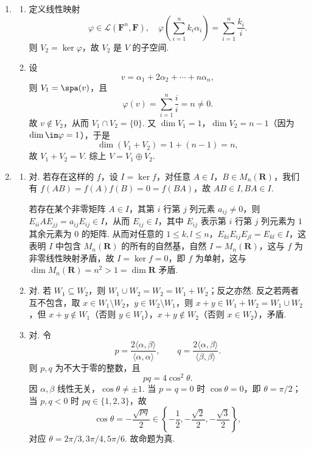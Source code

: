 \begin{enumerate}
\begin{enumerate}
        \item $k=2$：对角元为零，且 $a_{ji}=2a_{ij}\ (i<j)$. 基为
        \[
            \{E_{ij}+2E_{ji}\mid 1\leqslant i<j\leqslant n\},
        \]
        维数为 $\dfrac{n(n-1)}2$.
    \end{enumerate}

    \item
    \begin{enumerate}
        \item 定义线性映射
        \[
            \varphi\in\mathcal{L}(\mathbf{F}^n,\mathbf{F}), \quad\varphi\left(\sum_{i=1}^nk_i\alpha_i\right)
            =\sum_{i=1}^n\frac{k_i}{i}.
        \]
        则 $V_2=\ker\varphi$，故 $V_2$ 是 $V$ 的子空间.

        \item 设
        \[
            v=\alpha_1+2\alpha_2+\cdots+n\alpha_n,
        \]
        则 $V_1=\spa(v)$，且
        \[
            \varphi(v)=\sum_{i=1}^n\frac{i}{i}=n\neq 0.
        \]
        故 $v\notin V_2$，从而 $V_1\cap V_2=\{0\}$. 又 $\dim V_1=1$，$\dim V_2=n-1$（因为 $\dim\im\varphi=1$），于是
        \[
            \dim(V_1+V_2)=1+(n-1)=n,
        \]
        故 $V_1+V_2=V$. 综上 $V=V_1\oplus V_2$.
    \end{enumerate}

    \item
    \begin{enumerate}
        \item 对. 若存在这样的 $f$，设 $I=\ker f$，对任意 $A \in I$，$B \in M_n(\mathbf{R})$，我们有 $f(AB)=f(A)f(B)=0=f(BA)$，故 $AB \in I, BA \in I$.

        若存在某个非零矩阵 $A \in I$，其第 $i$ 行第 $j$ 列元素 $a_{ij}\neq 0$，则 $E_{ii}AE_{jj}=a_{ij}E_{ij}\in I$，从而 $E_{ij} \in I$，其中 $E_{ij}$ 表示第 $i$ 行第 $j$ 列元素为 $1$ 其余元素为 $0$ 的矩阵. 从而对任意的 $1 \leqslant k,l \leqslant n$，$E_{ki}E_{ij}E_{jl}=E_{kl}\in I$，这表明 $I$ 中包含 $M_n(\mathbf{R})$ 的所有的自然基，自然 $I=M_n(\mathbf{R})$，这与 $f$ 为非零线性映射矛盾，故 $I=\ker f = 0$，即 $f$ 为单射，这与 $\dim M_n(\mathbf{R})=n^2>1=\dim\mathbf{R}$ 矛盾.

        \item 对. 若 $W_1\subseteq W_2$，则 $W_1\cup W_2=W_2=W_1+W_2$；反之亦然. 反之若两者互不包含，取 $x\in W_1\setminus W_2$，$y\in W_2\setminus W_1$，则 $x+y\in W_1+W_2=W_1\cup W_2$，但 $x+y\notin W_1$（否则 $y\in W_1$），$x+y\notin W_2$（否则 $x\in W_2$），矛盾.

        \item 对. 令
        \[
            p=\frac{2\langle\alpha,\beta\rangle}{\langle\alpha,\alpha\rangle},\qquad
            q=\frac{2\langle\alpha,\beta\rangle}{\langle\beta,\beta\rangle}.
        \]
        则 $p,q$ 为不大于零的整数，且
        \[
            pq=4\cos^2\theta.
        \]
        因 $\alpha,\beta$ 线性无关，$\cos\theta\neq\pm1$. 当 $p=q=0$ 时 $\cos\theta=0$，即 $\theta=\pi/2$；当 $p,q<0$ 时 $pq\in\{1,2,3\}$，故
        \[
            \cos\theta=-\frac{\sqrt{pq}}2\in\left\{-\frac12,-\frac{\sqrt2}{2},-\frac{\sqrt3}{2}\right\},
        \]
        对应 $\theta=2\pi/3,3\pi/4,5\pi/6$. 故命题为真.


\end{enumerate}
\end{enumerate}
